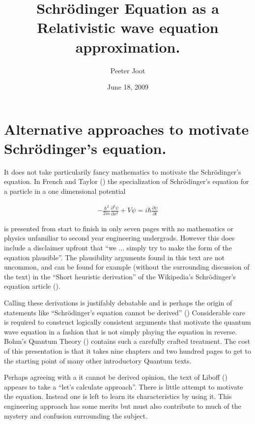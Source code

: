 \documentclass[]{eliblog}
\title{Schr\"{o}dinger Equation as a Relativistic wave equation approximation.}
\author{Peeter Joot}
\date{June 18, 2009}
\begin{document}
\maketitle

\section{Alternative approaches to motivate Schr\"{o}dinger's equation.}

It does not take particularily fancy mathematics to motivate the Schr\"{o}dinger's equation.  In
French and Taylor (\cite{french1998iqp}) the specialization of Schr\"{o}dinger's equation for a 
particle in a one dimensional potential

\begin{align}\label{eqn:oneDimSch}
-\frac{\hbar^2}{2m} \frac{\partial^2 \psi}{\partial x^2} + V\psi = i \hbar \frac{\partial \psi}{\partial t}
\end{align}

is presented from start to finish in only seven pages with no mathematics or physics unfamiliar to second year 
engineering undergrads.  However this does include a disclaimer upfront that
``we ... simply try to make the form of the equation plausible''.  The plausibility arguments
found in this text are not uncommon, and can be found for example (without the surrounding discussion of the text) 
in the ``Short heuristic derivation'' of the Wikipedia's Schr\"{o}dinger's equation article (\cite{wikiSchH}).

Calling these derivations is justifably debatable and is perhaps the origin of statements like
``Schr\"{o}dinger's equation cannot be derived'' (\cite{hyperphysicsSch})
Considerable care 
is required to construct logically consistent arguments that motivate the quantum wave
equation in a fashion that is not simply playing the equation in reverse.  Bohm's Quantum Theory
(\cite{bohm1989qt}) contains such a carefully crafted treatment.  The cost 
of this presentation
is that it takes nine chapters and two hundred pages to get to
the starting point of many other introductory Quantum texts.

Perhaps agreeing with a it cannot be derived opinion, the text of Liboff (\cite{liboff2003iqm}) appears to take a 
``let's calculate approach''.  There is little attempt to motivate the equation.  Instead one is left to learn
its characteristics by using it.  This engineering approach has some merits but must also contribute to much of the mystery
and confusion surrounding the subject.
\end{document}
